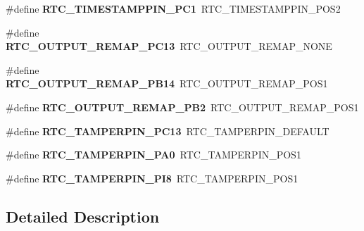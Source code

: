 \begin{DoxyCompactItemize}
\item 
\mbox{\label{group___h_a_l___r_t_c___aliased___defines_ga8bed03c3348ec3005e7b80e73fd13cc0}} 
\#define {\bfseries R\+T\+C\+\_\+\+T\+I\+M\+E\+S\+T\+A\+M\+P\+P\+I\+N\+\_\+\+P\+C1}~R\+T\+C\+\_\+\+T\+I\+M\+E\+S\+T\+A\+M\+P\+P\+I\+N\+\_\+\+P\+O\+S2
\item 
\mbox{\label{group___h_a_l___r_t_c___aliased___defines_ga677d55aef2a7915a4a75befab8a5abaf}} 
\#define {\bfseries R\+T\+C\+\_\+\+O\+U\+T\+P\+U\+T\+\_\+\+R\+E\+M\+A\+P\+\_\+\+P\+C13}~R\+T\+C\+\_\+\+O\+U\+T\+P\+U\+T\+\_\+\+R\+E\+M\+A\+P\+\_\+\+N\+O\+NE
\item 
\mbox{\label{group___h_a_l___r_t_c___aliased___defines_gac67309963a2eaf95230e716c8e3f0377}} 
\#define {\bfseries R\+T\+C\+\_\+\+O\+U\+T\+P\+U\+T\+\_\+\+R\+E\+M\+A\+P\+\_\+\+P\+B14}~R\+T\+C\+\_\+\+O\+U\+T\+P\+U\+T\+\_\+\+R\+E\+M\+A\+P\+\_\+\+P\+O\+S1
\item 
\mbox{\label{group___h_a_l___r_t_c___aliased___defines_gae3219018581da1cc5687fe218d3f2a2d}} 
\#define {\bfseries R\+T\+C\+\_\+\+O\+U\+T\+P\+U\+T\+\_\+\+R\+E\+M\+A\+P\+\_\+\+P\+B2}~R\+T\+C\+\_\+\+O\+U\+T\+P\+U\+T\+\_\+\+R\+E\+M\+A\+P\+\_\+\+P\+O\+S1
\item 
\mbox{\label{group___h_a_l___r_t_c___aliased___defines_ga203603ca0741ea3f23beca505a121351}} 
\#define {\bfseries R\+T\+C\+\_\+\+T\+A\+M\+P\+E\+R\+P\+I\+N\+\_\+\+P\+C13}~R\+T\+C\+\_\+\+T\+A\+M\+P\+E\+R\+P\+I\+N\+\_\+\+D\+E\+F\+A\+U\+LT
\item 
\mbox{\label{group___h_a_l___r_t_c___aliased___defines_ga0eddec9c4aeae415fe983c2940a45a9d}} 
\#define {\bfseries R\+T\+C\+\_\+\+T\+A\+M\+P\+E\+R\+P\+I\+N\+\_\+\+P\+A0}~R\+T\+C\+\_\+\+T\+A\+M\+P\+E\+R\+P\+I\+N\+\_\+\+P\+O\+S1
\item 
\mbox{\label{group___h_a_l___r_t_c___aliased___defines_ga281fbac5fa3ba4677a329635519f2bb5}} 
\#define {\bfseries R\+T\+C\+\_\+\+T\+A\+M\+P\+E\+R\+P\+I\+N\+\_\+\+P\+I8}~R\+T\+C\+\_\+\+T\+A\+M\+P\+E\+R\+P\+I\+N\+\_\+\+P\+O\+S1
\end{DoxyCompactItemize}


\subsection{Detailed Description}
